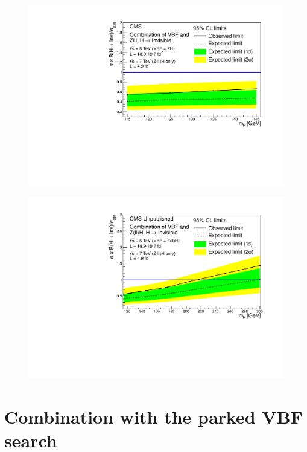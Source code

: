 \begin{figure}
  \includegraphics[width=\largefigwidth]{plots/prompt/HIG-13-30-figs/combinedlimit.pdf}
  \caption{}%
  \label{fig:promptcomb}
\end{figure}

\begin{figure}
  \includegraphics[width=\largefigwidth]{plots/prompt/HIG-13-30-figs/highmasslimit.pdf}
  \caption{}%
  \label{fig:promptcombhighmass}
\end{figure}

\section{Combination with the parked VBF search}
\label{sec:combparked}



